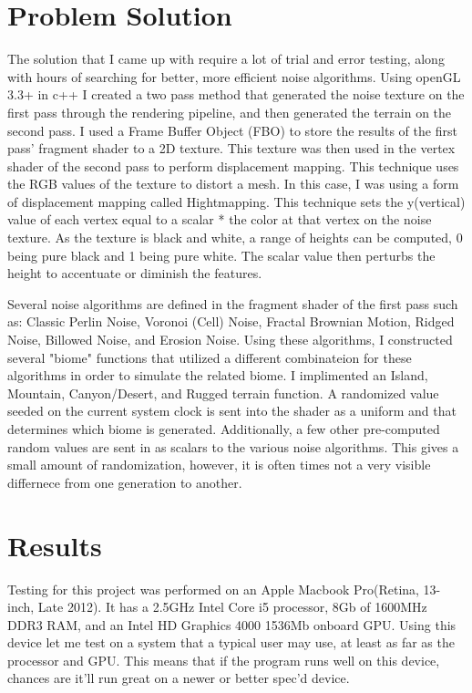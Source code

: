 \documentclass[12pt]{article}
\begin{document}
\section{Problem Solution}
    The solution that I came up with require a lot of trial and error testing, along with hours of searching for better,
    more efficient noise algorithms. Using openGL 3.3+ in c++ I created a two pass method that generated the noise
    texture on the first pass through the rendering pipeline, and then generated the terrain on the second pass. I used 
    a Frame Buffer Object (FBO) to store the results of the first pass' fragment shader to a 2D texture. This texture was 
    then used in the vertex shader of the second pass to perform displacement mapping. This technique uses the RGB values 
    of the texture to distort a mesh. In this case, I was using a form of displacement mapping called Hightmapping. This 
    technique sets the y(vertical) value of each vertex equal to a scalar * the color at that vertex on the noise texture.
    As the texture is black and white, a range of heights can be computed, 0 being pure black and 1 being pure white. The 
    scalar value then perturbs the height to accentuate or diminish the features. 

    Several noise algorithms are defined in the fragment shader of the first pass such as: Classic Perlin Noise, 
    Voronoi (Cell) Noise, Fractal Brownian Motion, Ridged Noise, Billowed Noise, and Erosion Noise. Using these algorithms,
    I constructed several "biome" functions that utilized a different combinateion for these algorithms in order to simulate 
    the related biome. I implimented an Island, Mountain, Canyon/Desert, and Rugged terrain function. A randomized value
    seeded on the current system clock is sent into the shader as a uniform and that determines which biome is generated.
    Additionally, a few other pre-computed random values are sent in as scalars to the various noise algorithms. This gives
    a small amount of randomization, however, it is often times not a very visible differnece from one generation to another.

\section{Results}
    Testing for this project was performed on an Apple Macbook Pro(Retina, 13-inch, Late 2012). It has a 2.5GHz Intel Core i5
    processor, 8Gb of 1600MHz DDR3 RAM, and an Intel HD Graphics 4000 1536Mb onboard GPU. Using this device let me test on a 
    system that a typical user may use, at least as far as the processor and GPU. This means that if the program runs well
    on this device, chances are it'll run great on a newer or better spec'd device. 
\end{document}
